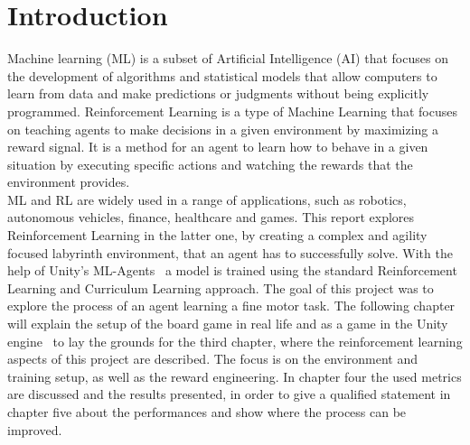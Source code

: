 
\section{Introduction}\label{sec:introduction}
Machine learning (ML) is a subset of Artificial Intelligence (AI) that focuses on the development of algorithms and statistical
models that allow computers to learn from data and make predictions or judgments without being explicitly programmed.
Reinforcement Learning is a type of Machine Learning that focuses on teaching agents to make decisions in a given environment
by maximizing a reward signal.
It is a method for an agent to learn how to behave in a given situation by executing specific
actions and watching the rewards that the environment provides.\\
ML and RL are widely used in a range of applications, such as robotics, autonomous vehicles, finance, healthcare and games.
This report explores Reinforcement Learning in the latter one, by creating a complex and agility focused labyrinth environment,
that an agent has to successfully solve.
With the help of Unity's ML-Agents~\cite{juliani2020} a model is trained using the standard Reinforcement Learning and Curriculum Learning approach.
The goal of this project was to explore the process of an agent learning a fine motor task.
The following chapter will explain the setup of the board game in real life and as a game in the Unity engine~\cite{Haas2014AHO} to lay the grounds
for the third chapter, where the reinforcement learning aspects of this project are described.
The focus is on the environment and training setup, as well as the reward engineering.
In chapter four the used metrics are discussed and the results presented, in order to give a qualified statement in chapter five
about the performances and show where the process can be improved.